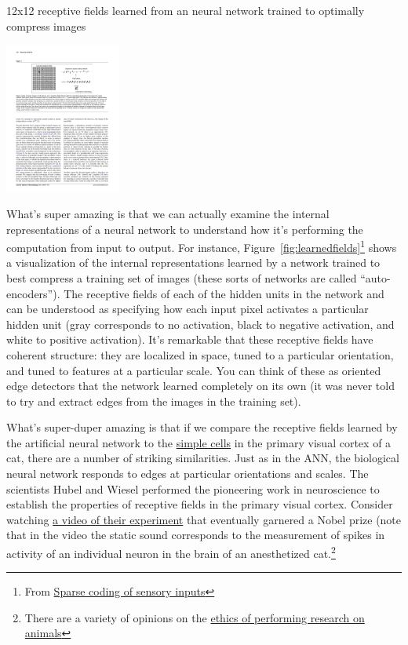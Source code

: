 \documentclass[assignment01_Solutions]{subfiles}
\begin{document}
\begin{marginfigure}

\caption{12x12 receptive fields learned from an neural network trained to optimally compress images}
\includegraphics[width=1.5in]{figures/learned_receptive_fields}\label{fig:learnedfields}
\end{marginfigure}
What's super amazing is that we can actually examine the internal representations of a neural network to understand how it's performing the computation from input to output. For instance, Figure~\ref{fig:learnedfields}\footnote{From \href{http://www.cnbc.cmu.edu/~tai/nc19journalclubs/Olshausen-Field-CON-2004-1.pdf}{Sparse coding of sensory inputs}} shows a visualization of the internal representations learned by a network trained to best compress a training set of images (these sorts of networks are called ``auto-encoders'').  The receptive fields of each of the hidden units in the network and can be understood as specifying how each input pixel activates a particular hidden unit (gray corresponds to no activation, black to negative activation, and white to positive activation).  It's remarkable that these receptive fields have coherent structure: they are localized in space, tuned to a particular orientation, and tuned to features at a particular scale.  You can think of these as oriented edge detectors that the network learned completely on its own (it was never told to try and extract edges from the images in the training set).

What's super-duper amazing is that if we compare the receptive fields learned by the artificial neural network to the \href{https://en.wikipedia.org/wiki/Simple_cell}{simple cells} in the primary visual cortex of a cat, there are a number of striking similarities.  Just as in the ANN, the biological neural network responds to edges at particular orientations and scales.  The scientists Hubel and Wiesel performed the pioneering work in neuroscience to establish the properties of receptive fields in the primary visual cortex.  Consider watching \href{https://www.youtube.com/watch?v=8VdFf3egwfg}{a video of their experiment} that eventually garnered a Nobel prize (note that in the video the static sound corresponds to the measurement of spikes in activity of an individual neuron in the brain of an anesthetized cat.\footnote{There are a variety of opinions on the \href{https://en.wikipedia.org/wiki/Animal_testing\#Ethics}{ethics of performing research on animals}}
\end{document}
